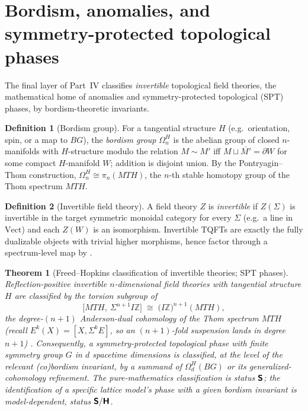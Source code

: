 \documentclass[12pt]{article}
\newtheorem{theorem}{Theorem}[section]
\theoremstyle{definition}
\newtheorem{definition}[definition]{Definition}
\theoremstyle{remark}
\newcommand{\Vect}{\mathrm{Vect}}
\newcommand{\Zm}{\mathbb{Z}}
\newcommand{\Sfont}{\textnormal{\sffamily\bfseries S}}
\newcommand{\Hfont}{\textnormal{\sffamily\bfseries H}}
\begin{document}
\section{Bordism, anomalies, and symmetry-protected topological phases}
\label{sec:bordism}

The final layer of Part~IV classifies \emph{invertible} topological field
theories, the mathematical home of anomalies and symmetry-protected
topological (SPT) phases, by bordism-theoretic invariants.

\begin{definition}[Bordism group]
\label{def:bordism}
For a tangential structure $H$ (e.g.\ orientation, spin, or a map to $BG$), the
\emph{bordism group} $\Omega_n^H$ is the abelian group of closed $n$-manifolds
with $H$-structure modulo the relation $M\sim M'$ iff $M\sqcup\overline{M'}=\partial W$
for some compact $H$-manifold $W$; addition is disjoint union. By the
Pontryagin--Thom construction, $\Omega_n^H\cong\pi_n(MTH)$, the $n$-th stable
homotopy group of the Thom spectrum $MTH$.
\end{definition}

\begin{definition}[Invertible field theory]
\label{def:invertible}
A field theory $Z$ is \emph{invertible} if $Z(\Sigma)$ is invertible in the target
symmetric monoidal category for every $\Sigma$ (e.g.\ a line in $\Vect$) and each
$Z(W)$ is an isomorphism. Invertible TQFTs are exactly the fully dualizable
objects with trivial higher morphisms, hence factor through a spectrum-level map
by .
\end{definition}

\begin{theorem}[Freed--Hopkins classification of invertible theories; SPT phases]
\label{thm:spt}
Reflection-positive invertible $n$-dimensional field theories with tangential
structure $H$ are classified by the torsion subgroup of
\[
  \bigl[MTH,\ \Sigma^{n+1}I\Zm\bigr] \;\cong\; \bigl(I\Zm\bigr)^{n+1}(MTH),
\]
the degree-$(n+1)$ Anderson-dual cohomology of the Thom spectrum $MTH$
(recall $E^k(X)=[X,\Sigma^k E]$, so an $(n+1)$-fold suspension lands in degree
$n+1$)
\cite{FreedHopkins}. Consequently, a symmetry-protected topological phase with
finite symmetry group $G$ in $d$ spacetime dimensions is classified, at the level
of the relevant (co)bordism invariant, by a summand of
$\Omega^{H}_{d}(BG)$ or its generalized-cohomology refinement. The pure-mathematics
classification is status $\Sfont$; the identification of a \emph{specific} lattice
model's phase with a given bordism invariant is model-dependent, status
$\Sfont/\Hfont$.
\end{theorem}
\end{document}
